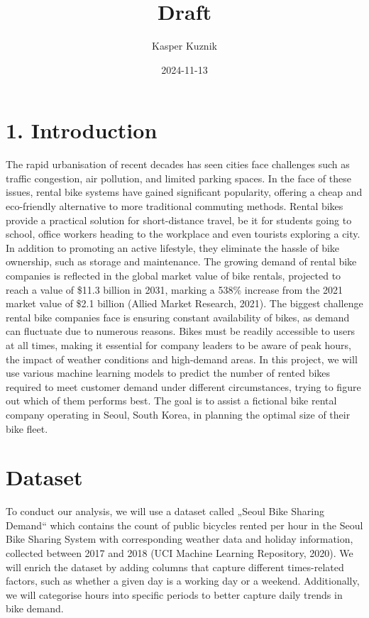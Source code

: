 \documentclass[
]{article}
\title{Draft}
\author{Kasper Kuznik}
\date{2024-11-13}
\begin{document}
\maketitle

\section{1. Introduction}\label{introduction}

The rapid urbanisation of recent decades has seen cities face challenges
such as traffic congestion, air pollution, and limited parking spaces.
In the face of these issues, rental bike systems have gained significant
popularity, offering a cheap and eco-friendly alternative to more
traditional commuting methods. Rental bikes provide a practical solution
for short-distance travel, be it for students going to school, office
workers heading to the workplace and even tourists exploring a city. In
addition to promoting an active lifestyle, they eliminate the hassle of
bike ownership, such as storage and maintenance. The growing demand of
rental bike companies is reflected in the global market value of bike
rentals, projected to reach a value of \$11.3 billion in 2031, marking a
538\% increase from the 2021 market value of \$2.1 billion (Allied
Market Research, 2021). The biggest challenge rental bike companies face
is ensuring constant availability of bikes, as demand can fluctuate due
to numerous reasons. Bikes must be readily accessible to users at all
times, making it essential for company leaders to be aware of peak
hours, the impact of weather conditions and high-demand areas. In this
project, we will use various machine learning models to predict the
number of rented bikes required to meet customer demand under different
circumstances, trying to figure out which of them performs best. The
goal is to assist a fictional bike rental company operating in Seoul,
South Korea, in planning the optimal size of their bike fleet.

\section{Dataset}\label{dataset}

To conduct our analysis, we will use a dataset called „Seoul Bike
Sharing Demand`` which contains the count of public bicycles rented per
hour in the Seoul Bike Sharing System with corresponding weather data
and holiday information, collected between 2017 and 2018 (UCI Machine
Learning Repository, 2020). We will enrich the dataset by adding columns
that capture different times-related factors, such as whether a given
day is a working day or a weekend. Additionally, we will categorise
hours into specific periods to better capture daily trends in bike
demand.
\end{document}
